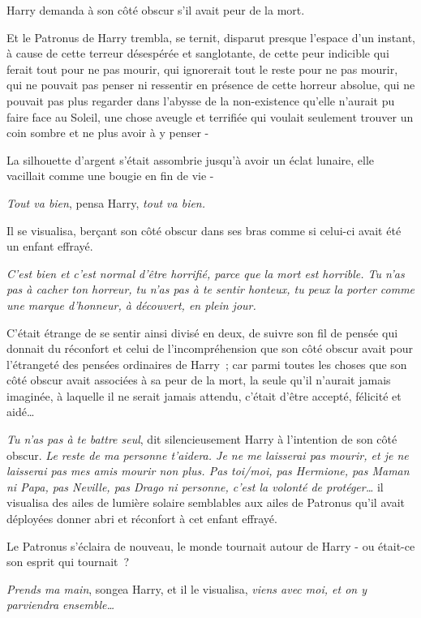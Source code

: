 Harry demanda à son côté obscur s'il avait peur de la mort.

Et le Patronus de Harry trembla, se ternit, disparut presque l'espace d'un instant, à cause de cette terreur désespérée et sanglotante, de cette peur indicible qui ferait tout pour ne pas mourir, qui ignorerait tout le reste pour ne pas mourir, qui ne pouvait pas penser ni ressentir en présence de cette horreur absolue, qui ne pouvait pas plus regarder dans l'abysse de la non-existence qu'elle n'aurait pu faire face au Soleil, une chose aveugle et terrifiée qui voulait seulement trouver un coin sombre et ne plus avoir à y penser -

La silhouette d'argent s'était assombrie jusqu'à avoir un éclat lunaire, elle vacillait comme une bougie en fin de vie -

\emph{Tout va bien}, pensa Harry, \emph{tout va bien.}

Il se visualisa, berçant son côté obscur dans ses bras comme si celui-ci avait été un enfant effrayé.

\emph{C'est bien et c'est normal d'être horrifié, parce que la mort est horrible. Tu n'as pas à cacher ton horreur, tu n'as pas à te sentir honteux, tu peux la porter comme une marque d'honneur, à découvert, en plein jour.}

C'était étrange de se sentir ainsi divisé en deux, de suivre son fil de pensée qui donnait du réconfort et celui de l'incompréhension que son côté obscur avait pour l'étrangeté des pensées ordinaires de Harry~; car parmi toutes les choses que son côté obscur avait associées à sa peur de la mort, la seule qu'il n'aurait jamais imaginée, à laquelle il ne serait jamais attendu, c'était d'être accepté, félicité et aidé…

\emph{Tu n'as pas à te battre seul}, dit silencieusement Harry à l'intention de son côté obscur. \emph{Le reste de ma personne t'aidera. Je ne me laisserai pas mourir, et je ne laisserai pas mes amis mourir non plus. Pas toi/moi, pas Hermione, pas Maman ni Papa, pas Neville, pas Drago ni personne, c'est la volonté de protéger…} il visualisa des ailes de lumière solaire semblables aux ailes de Patronus qu'il avait déployées donner abri et réconfort à cet enfant effrayé.

Le Patronus s'éclaira de nouveau, le monde tournait autour de Harry - ou était-ce son esprit qui tournait~?

\emph{Prends ma main}, songea Harry, et il le visualisa, \emph{viens avec moi, et on y parviendra ensemble…}

